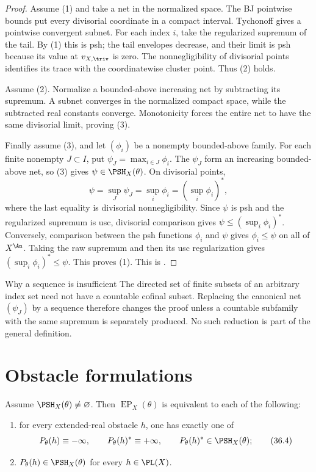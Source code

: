 \begin{proof}
Assume (1) and take a net in the normalized space.  The BJ pointwise bounds
put every divisorial coordinate in a compact interval.  Tychonoff gives a
pointwise convergent subnet.  For each index $i$, take the regularized
supremum of the tail.  By (1) this is psh; the tail envelopes decrease, and
their limit is psh because its value at $v_{X,\triv}$ is zero.  The
nonnegligibility of divisorial points identifies its trace with the
coordinatewise cluster point.  Thus (2) holds.

Assume (2).  Normalize a bounded-above increasing net by subtracting its
supremum.  A subnet converges in the normalized compact space, while the
subtracted real constants converge.  Monotonicity forces the entire net to
have the same divisorial limit, proving (3).

Finally assume (3), and let $(\phi_i)$ be a nonempty bounded-above family.
For each finite nonempty $J\subset I$, put
$\psi_J=\max_{i\in J}\phi_i$.  The $\psi_J$ form an increasing
bounded-above net, so (3) gives $\psi\in\PSH_X(\theta)$.  On divisorial
points,
\[
             \psi=\sup_J\psi_J=\sup_i\phi_i
                   =\left(\sup_i\phi_i\right)^*,
\]
where the last equality is divisorial nonnegligibility.  Since $\psi$ is
psh and the regularized supremum is usc, divisorial comparison gives
$\psi\leq(\sup_i\phi_i)^*$.  Conversely, comparison between the psh
functions $\phi_i$ and $\psi$ gives $\phi_i\leq\psi$ on all of
$X^{\An}$.  Taking the raw supremum and then its usc regularization gives
$(\sup_i\phi_i)^*\leq\psi$.  This proves (1).
This is \cite[Theorem~5.11]{BJ22}.
\end{proof}

\begin{warning}{Why a sequence is insufficient}
\label{warn:sequence-insufficient-envelope}
The directed set of finite subsets of an arbitrary index set need not have a
countable cofinal subset.  Replacing the canonical net $(\psi_J)$ by a
sequence therefore changes the proof unless a countable subfamily with the
same supremum is separately produced.  No such reduction is part of the
general definition.
\end{warning}

\section{Obstacle formulations}

\begin{theorem}\label{thm:general-obstacle-criterion}
Assume $\PSH_X(\theta)\ne\varnothing$.  Then
$\operatorname{EP}_X(\theta)$ is equivalent to each of the following:
\begin{enumerate}
\item for every extended-real obstacle $h$, one has exactly one of
\[
 P_\theta(h)\equiv-\infty,\qquad
 P_\theta(h)^*\equiv+\infty,\qquad
 P_\theta(h)^*\in\PSH_X(\theta);
\tag{36.4}\label{eq:envelope-trichotomy}
\]
\item $P_\theta(h)\in\PSH_X(\theta)$ for every
      $h\in\PL(X)$.
\end{enumerate}
\par
\end{theorem}

